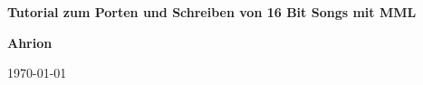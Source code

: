 \begin{titlepage}
    \begin{center}
        \vspace*{1cm}
            
        \Huge
        \textbf{Tutorial zum Porten und Schreiben von 16 Bit Songs mit MML}
            
        \vspace{0.5cm}
        \LARGE

            
        \vspace{1.5cm}
            
        \textbf{Ahrion}
        
        \vspace{1.5cm}
        
        \today
        
            

            
    \end{center}
\end{titlepage}